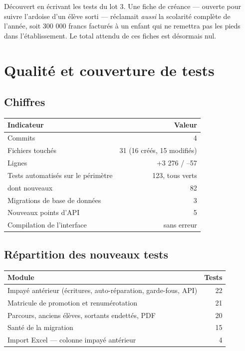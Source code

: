 \documentclass[11pt,a4paper]{report}
\begin{document}
Découvert en écrivant les tests du lot 3. Une fiche de créance --- ouverte pour
suivre l'ardoise d'un élève sorti --- réclamait \emph{aussi} la scolarité
complète de l'année, soit 300 000 francs facturés à un enfant qui ne remettra
pas les pieds dans l'établissement. Le total attendu de ces fiches est
désormais nul.

\chapter{Qualité et couverture de tests}

\section{Chiffres}

\begin{center}
\begin{tabularx}{\linewidth}{@{}Xr@{}}
\toprule
\textbf{Indicateur} & \textbf{Valeur} \\
\midrule
Commits & 4 \\
Fichiers touchés & 31 (16 créés, 15 modifiés) \\
Lignes & +3 276 / --57 \\
Tests automatisés sur le périmètre & 123, tous verts \\
\quad dont nouveaux & 82 \\
Migrations de base de données & 3 \\
Nouveaux points d'API & 5 \\
Compilation de l'interface & sans erreur \\
\bottomrule
\end{tabularx}
\end{center}

\section{Répartition des nouveaux tests}

\begin{center}
\begin{tabularx}{\linewidth}{@{}Xr@{}}
\toprule
\textbf{Module} & \textbf{Tests} \\
\midrule
Impayé antérieur (écritures, auto-réparation, garde-fous, API) & 22 \\
Matricule de promotion et renumérotation & 21 \\
Parcours, anciens élèves, sortants endettés, PDF & 20 \\
Santé de la migration & 15 \\
Import Excel --- colonne impayé antérieur & 4 \\
\bottomrule
\end{tabularx}
\end{center}
\end{document}
